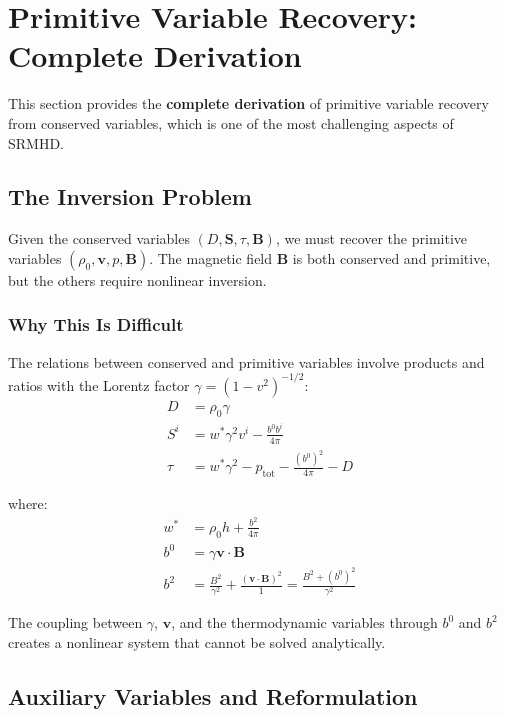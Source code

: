 \documentclass[12pt,a4paper]{article}
\begin{document}
\section{Primitive Variable Recovery: Complete Derivation}

This section provides the \textbf{complete derivation} of primitive variable recovery
from conserved variables, which is one of the most challenging aspects of SRMHD.

\subsection{The Inversion Problem}

Given the conserved variables $(D, \bm{S}, \tau, \bm{B})$, we must recover the
primitive variables $(\rho_0, \bm{v}, p, \bm{B})$. The magnetic field $\bm{B}$
is both conserved and primitive, but the others require nonlinear inversion.

\subsubsection{Why This Is Difficult}

The relations between conserved and primitive variables involve products and
ratios with the Lorentz factor $\gamma = (1 - v^2)^{-1/2}$:
\begin{align}
D &= \rho_0 \gamma \label{eq:D_def} \\
S^i &= w^* \gamma^2 v^i - \frac{b^0 b^i}{4\pi} \label{eq:S_def_full} \\
\tau &= w^* \gamma^2 - p_\text{tot} - \frac{(b^0)^2}{4\pi} - D \label{eq:tau_def_full}
\end{align}

where:
\begin{align}
w^* &= \rho_0 h + \frac{b^2}{4\pi} \label{eq:wstar} \\
b^0 &= \gamma \bm{v} \cdot \bm{B} \label{eq:b0_def} \\
b^2 &= \frac{B^2}{\gamma^2} + \frac{(\bm{v} \cdot \bm{B})^2}{1} = \frac{B^2 + (b^0)^2}{\gamma^2}
\label{eq:b2_def}
\end{align}

The coupling between $\gamma$, $\bm{v}$, and the thermodynamic variables through
$b^0$ and $b^2$ creates a nonlinear system that cannot be solved analytically.

\subsection{Auxiliary Variables and Reformulation}
\end{document}
